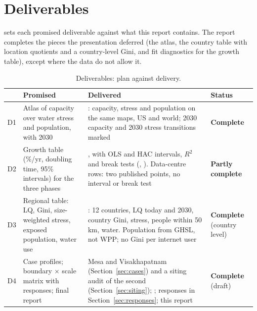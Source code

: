 \section{Deliverables}\label{sec:deliverables}

 sets each promised deliverable against what this report contains. The report completes the pieces
the presentation deferred (the atlas, the country table with location quotients and a country-level Gini, and fit
diagnostics for the growth table), except where the data do not allow it.

\begin{table}[t]\centering
\caption{Deliverables: plan against delivery.}
\label{tab:deliv}
\footnotesize\renewcommand{\arraystretch}{1.12}\setlength{\tabcolsep}{4pt}
\begin{tabular}{@{}l P{2.05cm} P{3.55cm} P{1.45cm}@{}}
\toprule
 & Promised & Delivered & Status \\
\midrule
D1 & Atlas of capacity over water stress and population, with 2030 & : capacity, stress and population
on the same maps, US and world; 2030 capacity and 2030 stress transitions marked & \textbf{Complete} \\
D2 & Growth table (\%/yr, doubling time, 95\% intervals) for the three phases & , with OLS and HAC
intervals, $R^2$ and break tests (, ). Data-centre rows: two published points, no
interval or break test & \textbf{Partly complete} \\
D3 & Regional table: LQ, Gini, size-weighted stress, exposed population, water use & : 12 countries,
LQ today and 2030, country Gini, stress, people within 50\,km, water. Population from GHSL, not WPP; no Gini per
internet user & \textbf{Complete} (country level) \\
D4 & Case profiles; boundary $\times$ scale matrix with responses; final report & Mesa and Visakhapatnam
(Section~\ref{sec:cases}) and a siting audit of the second (Section~\ref{sec:siting}); ; responses in Section~\ref{sec:responses}; this report &
\textbf{Complete} (draft) \\
\bottomrule
\end{tabular}
\end{table}

